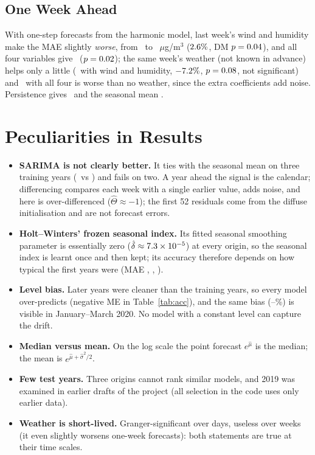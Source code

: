\documentclass[11pt,a4paper,twoside,twocolumn]{extarticle}
\newcommand{\ugm}{$\mu$g/m$^3$}
\newcommand{\sech}[1]{\textbf{\textsf{#1}}}
\begin{document}
\subsection{One Week Ahead}
With one-step forecasts from the harmonic model, last week's wind and humidity make the MAE slightly \emph{worse}, from \oneNo\ to \oneLag\ \ugm{} ($2.6\%$, DM $p=0.04$), and all four variables give \oneLagFour\ ($p=0.02$); the same week's weather (not known in advance) helps only a little (\oneOracle\ with wind and humidity, $-7.2\%$, $p=0.08$, not significant) and \oneOracleFour\ with all four is worse than no weather, since the extra coefficients add noise. Persistence gives \onePers\ and the seasonal mean \oneMean.
\begin{table}[t]\centering\scriptsize\setlength{\tabcolsep}{3pt}\caption{One-week-ahead MAE (\ugm{}).}\label{tab:one}\end{table}

\section{Peculiarities in Results}
\begin{itemize}\setlength\itemsep{1pt}\setlength\topsep{2pt}
 \item \sech{SARIMA is not clearly better.} It ties with the seasonal mean on three training years (\maeSarimaAvg\ vs \maeMeanAvg) and fails on two. A year ahead the signal is the calendar; differencing compares each week with a single earlier value, adds noise, and here is over-differenced ($\hat\Theta\approx-1$); the first 52 residuals come from the diffuse initialisation and are not forecast errors.
 \item \sech{Holt--Winters' frozen seasonal index.} Its fitted seasonal smoothing parameter is essentially zero ($\hat\delta\approx7.3\times10^{-5}$) at every origin, so the seasonal index is learnt once and then kept; its accuracy therefore depends on how typical the first years were (MAE \maeHWSeventeen, \maeHWEighteen, \maeHWNineteen).
 \item \sech{Level bias.} Later years were cleaner than the training years, so every model over-predicts (negative ME in Table~\ref{tab:acc}), and the same bias (\preBiasLo--\preBiasHi\%) is visible in January--March 2020. No model with a constant level can capture the drift.
 \item \sech{Median versus mean.} On the log scale the point forecast $e^{\hat\mu}$ is the median; the mean is $e^{\hat\mu+\hat\sigma^2/2}$.
 \item \sech{Few test years.} Three origins cannot rank similar models, and 2019 was examined in earlier drafts of the project (all selection in the code uses only earlier data).
 \item \sech{Weather is short-lived.} Granger-significant over days, useless over weeks (it even slightly worsens one-week forecasts): both statements are true at their time scales.
\end{itemize}
\end{document}
